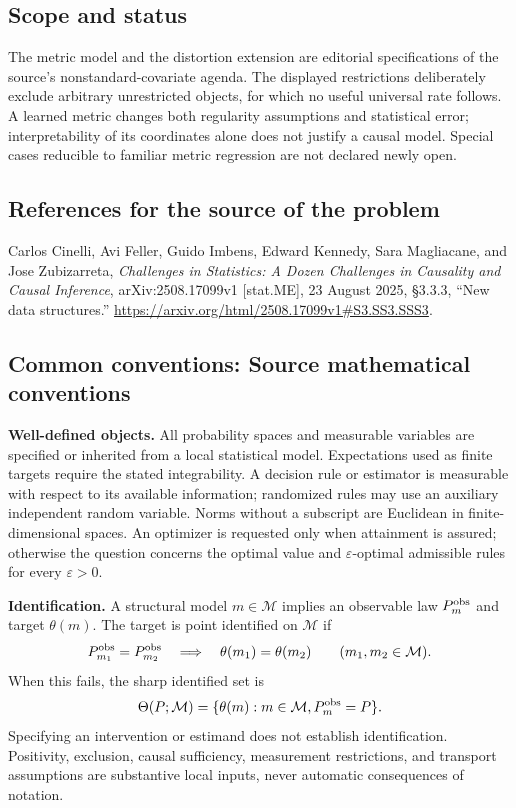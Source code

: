 \documentclass[11pt,a4paper]{article}
\begin{document}
\subsection*{Scope and status}
The metric model and the distortion extension are editorial specifications of the source's nonstandard-covariate agenda. The displayed restrictions deliberately exclude arbitrary unrestricted objects, for which no useful universal rate follows. A learned metric changes both regularity assumptions and statistical error; interpretability of its coordinates alone does not justify a causal model. Special cases reducible to familiar metric regression are not declared newly open.
\subsection*{References for the source of the problem}
Carlos Cinelli, Avi Feller, Guido Imbens, Edward Kennedy, Sara Magliacane, and Jose Zubizarreta, \emph{Challenges in Statistics: A Dozen Challenges in Causality and Causal Inference}, arXiv:2508.17099v1 [stat.ME], 23 August 2025, \S3.3.3, ``New data structures.'' \url{https://arxiv.org/html/2508.17099v1#S3.SS3.SSS3}.

\subsection*{Common conventions: Source mathematical conventions}

\textbf{Well-defined objects.}
All probability spaces and measurable variables are specified or inherited
from a local statistical model. Expectations used as finite targets require
the stated integrability. A decision rule or estimator is measurable with
respect to its available information; randomized rules may use an auxiliary
independent random variable. Norms without a subscript are Euclidean in
finite-dimensional spaces. An optimizer is requested only when attainment
is assured; otherwise the question concerns the optimal value and
$\varepsilon$-optimal admissible rules for every $\varepsilon>0$.

\textbf{Identification.}
A structural model $m\in\mathcal M$ implies an observable law
$P_m^{\rm obs}$ and target $\theta(m)$. The target is point identified on
$\mathcal M$ if
\[
 P_{m_1}^{\rm obs}=P_{m_2}^{\rm obs}
 \quad\Longrightarrow\quad\theta(m_1)=\theta(m_2)
 \qquad(m_1,m_2\in\mathcal M).
\]
When this fails, the sharp identified set is
\[
 \Theta(P;\mathcal M)=\{\theta(m):m\in\mathcal M,
                                  P_m^{\rm obs}=P\}.
\]
Specifying an intervention or estimand does not establish identification.
Positivity, exclusion, causal sufficiency, measurement restrictions, and
transport assumptions are substantive local inputs, never automatic
consequences of notation.
\end{document}
